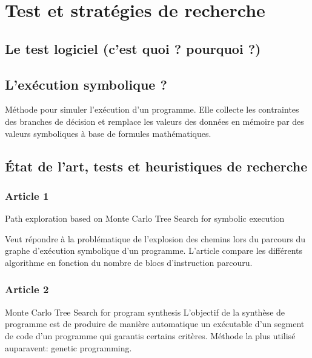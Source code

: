 
\chapter{Test et stratégies de recherche}

\label{Chapter2} %


\section{Le test logiciel (c'est quoi ? pourquoi ?)}


\section{L'exécution symbolique ?}
Méthode pour simuler l'exécution d'un programme.
Elle collecte les contraintes des branches de décision et remplace les valeurs des données en mémoire par des valeurs symboliques à base de formules mathématiques.


\section{État de l'art, tests et heuristiques de recherche}

\subsection{Article 1}
Path exploration based  on Monte Carlo Tree Search for symbolic execution

Veut répondre à la problématique de l'explosion des chemins lors du parcours du graphe d'exécution symbolique d'un programme.
L'article compare les différents algorithme en fonction du nombre de blocs d'instruction parcouru.

\subsection{Article 2}
Monte Carlo Tree Search for program synthesis
L'objectif de la synthèse de programme est de produire de manière automatique un exécutable d'un segment de code d'un programme qui garantis certains critères.
Méthode la plus utilisé auparavent: genetic programming.